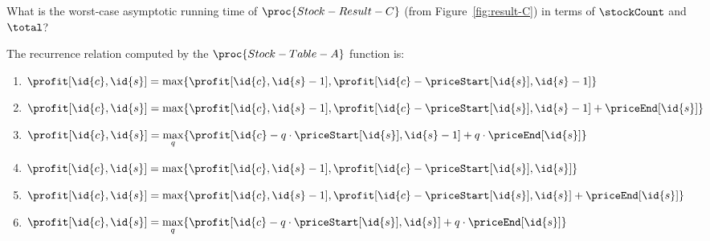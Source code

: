 \documentclass[12pt,twoside]{article}
\newcommand{\answerIIl}{\solution{
1
}}
\newcommand{\answerIIm}{\solution{
1
}}
\newcommand{\answerIIn}{\solution{
4
}}
\begin{document}
\begin{problems}
\begin{problemparts}
\answerIIl
\end{problemparts}

\begin{problemparts}
\problempart
{}
What is the worst-case asymptotic running time of
$\proc{Stock-Result-C}$
(from Figure~\ref{fig:result-C})
in terms of $\stockCount$ and $\total$?
\runtimeAnswers

\answerIIm
\end{problemparts}

\begin{problemparts}

\problempart
{}
The recurrence relation computed
by the $\proc{Stock-Table-A}$ function
is:
\begin{enumerate}
\item $\profit[\id{c}, \id{s}] = \displaystyle\max\{ \profit[\id{c}, \id{s}- 1], \profit[\id{c} - \priceStart[\id{s}], \id{s} - 1] \}$
\item $\profit[\id{c}, \id{s}] = \displaystyle\max\{ \profit[\id{c}, \id{s}- 1], \profit[\id{c} - \priceStart[\id{s}], \id{s} - 1] + \priceEnd[\id{s}]\}$
\item $\profit[\id{c}, \id{s}] = \displaystyle\max_q \{ \profit[\id{c} - q \cdot \priceStart[\id{s}], \id{s} - 1 ]+ q \cdot \priceEnd[\id{s}] \}$
\item $\profit[\id{c}, \id{s}] = \displaystyle\max\{ \profit[\id{c}, \id{s}- 1], \profit[\id{c} - \priceStart[\id{s}], \id{s} ] \}$
\item $\profit[\id{c}, \id{s}] = \displaystyle\max\{ \profit[\id{c}, \id{s}- 1], \profit[\id{c} - \priceStart[\id{s}], \id{s} ]+ \priceEnd[\id{s}] \}$
\item $\profit[\id{c}, \id{s}] = \displaystyle\max_q\{ \profit[\id{c} - q \cdot \priceStart[\id{s}], \id{s} ]+ q \cdot \priceEnd[\id{s}] \}$
\end{enumerate}

\answerIIn


\end{problemparts}
\end{problems}
\end{document}
